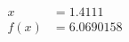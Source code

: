 \documentclass[preview]{standalone}
\begin{document}
\begin{align*}
x &= 1.4111\\f(x) &= 6.0690158
\end{align*}
\end{document}
